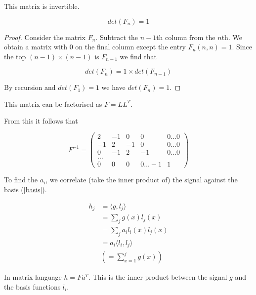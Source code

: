 \documentclass{article}
\begin{document}
This matrix is invertible.

\begin{theorem}
\begin{equation}
det(F_n) = 1
\end{equation}
\end{theorem}
\begin{proof}
Consider the matrix \(F_n\). Subtract the \(n-1\)th column from the \(n\)th. We obtain a matrix with \(0\) on the final column except the entry \(F_n(n,n) = 1\). Since the top \((n-1) \times (n-1)\) is \(F_{n-1}\) we find that 

\begin{equation}
det(F_n) = 1 \times det(F_{n-1})
\end{equation} 

By recursion and \(det(F_1) = 1\) we have \(det(F_n) = 1\).

\end{proof}

This matrix can be factorised as \(F = LL^T\).

From this it follows that

\begin{equation}
F^{-1} = \begin{pmatrix}
 2 & -1 & 0 & 0  & 0 \ldots 0 \\
  -1 & 2 & -1 & 0  & 0 \ldots 0\\
     0 & -1 & 2 & -1  & 0 \ldots0  \\
    \ldots  \\
     0 & 0 & 0 & 0  \ldots -1 & 1 
\end{pmatrix}
\end{equation}

To find the \(a_i\), we correlate (take the inner product of) the signal against the basis (\ref{basis}).

\begin{definition}
\begin{align}
h_j &= \langle g, l_j \rangle \\
&= \sum_j g\left(x\right) l_j\left(x\right) \\
&= \sum_j a_i l_i\left(x\right) l_j\left(x\right) \\
&= a_i \langle l_i, l_j\rangle \\
&\left(= \sum_{x=1}^j g\left(x\right)\right)
\end{align}

In matrix language \(h = F a^T\). This is the inner product between the signal \(g\) and the basis functions \(l_i\).
\end{definition}
\end{document}
